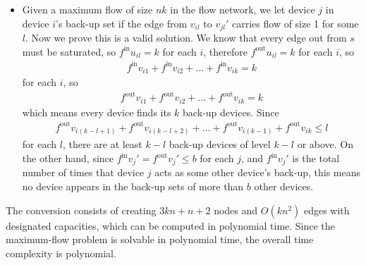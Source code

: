 \documentclass[12pt,letterpaper]{article}
\begin{document}
\begin{itemize}
\item Given a maximum flow of size $nk$ in the flow network, we let device $j$ in device $i$'s back-up set if the edge from $v_{il}$ to $v_{jl}'$ carries flow of size 1 for some $l$. Now we prove this is a valid solution. We know that every edge out from $s$ must be saturated, so $f^{\textrm{in}}u_{il}=k$ for each $i$, therefore $f^{\textrm{out}}u_{il}=k$ for each $i$, so 
\begin{align*}
f^{\textrm{in}}v_{i1}+f^{\textrm{in}}v_{i2}+\dots+f^{\textrm{in}}v_{ik} = k
\end{align*} 
for each $i$, so 
\begin{align*}
f^{\textrm{out}}v_{i1}+f^{\textrm{out}}v_{i2}+\dots+f^{\textrm{out}}v_{ik} = k
\end{align*} 
which means every device finds its $k$ back-up devices. Since 
\begin{align*}
f^{\textrm{out}}v_{i(k-l+1)} + f^{\textrm{out}}v_{i(k-l+2)} + \dots + f^{\textrm{out}}v_{i(k-1)} + f^{\textrm{out}}v_{ik} \le l
\end{align*}
for each $l$, there are at least $k-l$ back-up devices of level $k-l$ or above. On the other hand, since $f^{\textrm{in}}v_j'=f^{\textrm{out}}v_j'\le b$ for each $j$, and $f^{\textrm{in}}v_j'$ is the total number of times that device $j$ acts as some other device's back-up, this means no device appears in the back-up sets of more than $b$ other devices. 
\end{itemize}

The conversion consists of creating $3kn+n+2$ nodes and $O(kn^2)$ edges with designated capacities, which can be computed in polynomial time. Since the maximum-flow problem is solvable in polynomial time, the overall time complexity is polynomial.
\end{document}
